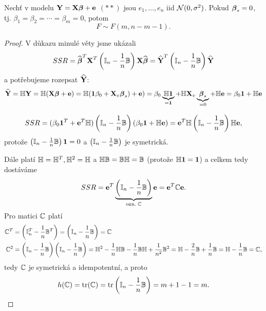 \begin{theorem}
Nechť v modelu $\textbf{Y} = \textbf{X} \boldsymbol{\beta} + \textbf{e}$ $(**)$ jsou $e_1, \dots, e_n$ iid $\mathcal{N}(0,\sigma^2)$. Pokud $\boldsymbol{\beta}_s = 0$, tj. $\beta_1 = \beta_2 = \cdots = \beta_m = 0$, potom
$$
F \sim F(m, n - m -1).
$$
\end{theorem}

\begin{proof}
V důkazu minulé věty jsme ukázali
$$
SSR = \widehat{\boldsymbol{\beta}}^T \textbf{X}^T \left( \mathbb{I}_{n} - \frac{1}{n} \mathbb{B} \right) \textbf{X} \widehat{\boldsymbol{\beta}} = \widehat{\textbf{Y}}^T \left( \mathbb{I}_{n} - \frac{1}{n} \mathbb{B} \right) \widehat{\textbf{Y}}
$$
a potřebujeme rozepsat $\widehat{\textbf{Y}}$:
$$
\widehat{\textbf{Y}} = \mathbb{H} \textbf{Y} = \mathbb{H} (\textbf{X} \boldsymbol{\beta} + \textbf{e}) = \mathbb{H} (\mathbf{1} \beta_0 + \textbf{X}_v \boldsymbol{\beta}_s)+ \textbf{e}) = \beta_0 \underbrace{\mathbb{H} \mathbf{1}}_{= \mathbf{1}} + \mathbb{H} \textbf{X}_v \underbrace{\boldsymbol{\beta}_s}_{= 0} + \mathbb{H} \textbf{e} = \beta_0 \mathbf{1} + \mathbb{H} \textbf{e}
$$

$$
SSR = (\beta_0 \mathbf{1}^T + \textbf{e}^T \mathbb{H})\left( \mathbb{I}_{n} - \frac{1}{n} \mathbb{B} \right) (\beta_0 \mathbf{1} + \mathbb{H} \textbf{e}) = \textbf{e}^T \mathbb{H} \left( \mathbb{I}_{n} - \frac{1}{n} \mathbb{B} \right) \mathbb{H} \textbf{e},
$$
protože $\left( \mathbb{I}_{n} - \frac{1}{n} \mathbb{B} \right) \mathbf{1} = 0$ a $\left( \mathbb{I}_{n} - \frac{1}{n} \mathbb{B} \right)$ je symetrická.

Dále platí $\mathbb{H} = \mathbb{H}^T, \mathbb{H}^2 = \mathbb{H}$ a $\mathbb{H} \mathbb{B} = \mathbb{B} \mathbb{H} = \mathbb{B}$ (protože $\mathbb{H} \mathbf{1} = \mathbf{1}$) a celkem tedy dostáváme
$$
SSR = \textbf{e}^T \underbrace{\left( \mathbb{I}_{n} - \frac{1}{n} \mathbb{B} \right)}_{\text{ozn.} \; \mathbb{C}} \textbf{e} = \textbf{e}^T \mathbb{C} \textbf{e}.
$$
Pro matici $\mathbb{C}$ platí
\begin{align*}
\mathbb{C}^T & = \left( \mathbb{I}_{n}^T - \frac{1}{n} \mathbb{B}^T \right) = \left( \mathbb{I}_{n} - \frac{1}{n} \mathbb{B} \right) = \mathbb{C} \\
\mathbb{C}^2 & = \left( \mathbb{I}_{n} - \frac{1}{n} \mathbb{B} \right)\left( \mathbb{I}_{n} - \frac{1}{n} \mathbb{B} \right) = \mathbb{H}^2 - \frac{1}{n} \mathbb{H} \mathbb{B} - \frac{1}{n} \mathbb{B} \mathbb{H} + \frac{1}{n^2} \mathbb{B}^2 =  \mathbb{H} - \frac{2}{n} \mathbb{B} + \frac{1}{n} \mathbb{B} = \mathbb{H} - \frac{1}{n} \mathbb{B} = \mathbb{C},
\end{align*}
tedy $\mathbb{C}$ je symetrická a idempotentní, a proto
$$
h(\mathbb{C}) = \text{tr}(\mathbb{C}) = \text{tr} \left( \mathbb{I}_{n} - \frac{1}{n} \mathbb{B} \right) = m + 1 - 1 = m.
$$
\end{proof}